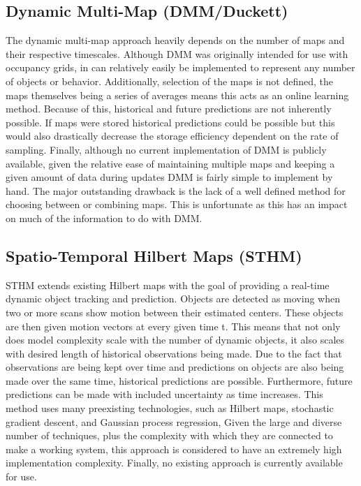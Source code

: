   \subsection { Dynamic Multi-Map (DMM/Duckett) }
  The dynamic multi-map approach heavily depends on the number of maps and their
  respective timescales. Although DMM was originally intended for use with
  occupancy grids, in can relatively easily be implemented to represent any
  number of objects or behavior. Additionally, selection of the maps is not
  defined, the maps themselves being a series of averages means this acts as
  an online learning method. Because of this, historical and future predictions
  are not inherently possible. If maps were stored historical predictions
  could be possible but this would also drastically decrease the storage
  efficiency dependent on the rate of sampling. Finally, although no current
  implementation of DMM is publicly available, given the relative ease of
  maintaining multiple maps and keeping a given amount of data during updates
  DMM is fairly simple to implement by hand. The major outstanding drawback
  is the lack of a well defined method for choosing between or combining maps.
  This is unfortunate as this has an impact on much of the information to do
  with DMM.

  \subsection{ Spatio-Temporal Hilbert Maps (STHM) }
  STHM extends existing Hilbert maps with the goal of providing a real-time
  dynamic object tracking and prediction. Objects are detected as moving when
  two or more scans show motion between their estimated centers. These objects
  are then given motion vectors at every given time t. This means that not
  only does model complexity scale with the number of dynamic objects, it also
  scales with desired length of historical observations being made. Due to the
  fact that observations are being kept over time and predictions on objects
  are also being made over the same time, historical predictions are possible.
  Furthermore, future predictions can be made with included uncertainty as
  time increases. This method uses many preexisting technologies, such
  as Hilbert maps, stochastic gradient descent, and Gaussian process regression,
  Given the large and diverse number of techniques, plus the complexity with
  which they are connected to make a working system, this approach is considered
  to have an extremely high implementation complexity. Finally, no existing
  approach is currently available for use.

